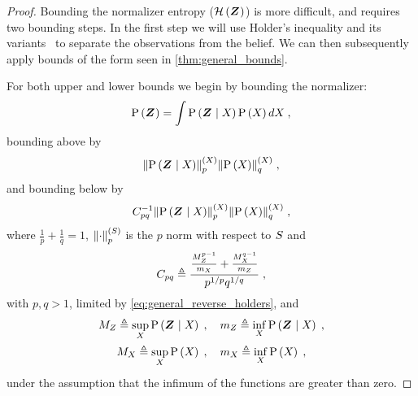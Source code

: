 \begin{proof}
	Bounding the normalizer entropy ($\mathcal{H}\left({\boldsymbol Z_{}}\right)$) is more difficult, and requires two bounding steps. In the first step we will use Holder's inequality and its variants~\cite{Wang77cmb} to separate the observations from the belief. We can then subsequently apply bounds of the form seen in \cref{thm:general_bounds}.

	For both upper and lower bounds we begin by bounding the normalizer:
	\begin{equation*}
		\mathrm{P}\left({\boldsymbol Z_{}}\right)=\int\mathrm{P}\left({\boldsymbol Z_{}}\mid{\ensuremath{X_{}}}\right)\mathrm{P}\left({X_{}}\right)dX_{}\;,
	\end{equation*}
	bounding above by
	\begin{equation}
		\pnorm{\probcond{\observationsRV{}}{\states{}}}{p}{\states{}}\pnorm{\prob{\states{}}}{q}{\states{}}\;,\label{eq:general_holders}
	\end{equation}
	and bounding below by~\cite{Wang77cmb}
	\begin{equation}
		C_{pq}^{-1}\pnorm{\probcond{\observationsRV{}}{\states{}}}{p}{\states{}}\pnorm{\prob{\states{}}}{q}{\states{}}\;,\label{eq:general_reverse_holders}
	\end{equation}
	where $\frac{1}{p}+\frac{1}{q}=1$, $\left\lVert\cdot\right\rVert_{p}^{(S)}$ is the $p$ norm with respect to $S$ and
	\begin{equation*}
		C_{pq}\triangleq\frac{\frac{M_{Z_{}}^{p-1}}{m_{X_{}}}+ \frac{M_{X_{}}^{q-1}}{m_{Z_{}}}}{p^{1/p}q^{1/q}}\;,
	\end{equation*}
	with $p,q>1$, limited by \eqref{eq:general_reverse_holders}, and
	\begin{gather*}
		M_{Z_{}}\triangleq\sup_{X_{}}\mathrm{P}\left({\boldsymbol Z_{}}\mid{\ensuremath{X_{}}}\right)\;,\quad
		m_{Z_{}}\triangleq\inf_{X_{}}\mathrm{P}\left({\boldsymbol Z_{}}\mid{\ensuremath{X_{}}}\right)\;,
		\\
		M_{X_{}}\triangleq\sup_{X_{}}\mathrm{P}\left({X_{}}\right)\;,\quad
		m_{X_{}}\triangleq\inf_{X_{}}\mathrm{P}\left({X_{}}\right)\;,
	\end{gather*}
	under the assumption that the infimum of the functions are greater than zero.


\end{proof}
